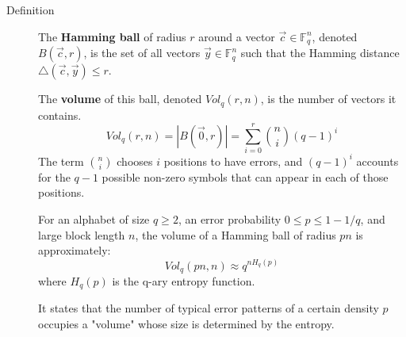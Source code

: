\begin{description}
    \item[Definition] The \textbf{Hamming ball} of radius $r$ around a vector $\vec{c} \in \mathbb{F}_q^n$, denoted $B(\vec{c}, r)$, is the set of all vectors $\vec{y} \in \mathbb{F}_q^n$ such that the Hamming distance $\triangle(\vec{c}, \vec{y}) \le r$.
    
    The \textbf{volume} of this ball, denoted $Vol_q(r, n)$, is the number of vectors it contains. 
    \[
        Vol_q(r, n) = |B(\vec{0}, r)| = \sum_{i=0}^r \binom{n}{i}(q-1)^i
    \]
    The term $\binom{n}{i}$ chooses $i$ positions to have errors, and $(q-1)^i$ accounts for the $q-1$ possible non-zero symbols that can appear in each of those positions.

    \begin{theorem}
    For an alphabet of size $q \ge 2$, an error probability $0 \le p \le 1 - 1/q$, and large block length $n$, the volume of a Hamming ball of radius $pn$ is approximately:
    \[
        Vol_q(pn, n) \approx q^{n H_q(p)}
    \]
    where $H_q(p)$ is the q-ary entropy function.
    \end{theorem}
    It states that the number of typical error patterns of a certain density $p$ occupies a "volume" whose size is determined by the entropy. 
\end{description}
